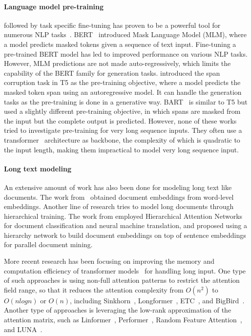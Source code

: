 \documentclass[11pt]{article}
\begin{document}
\paragraph{Language model pre-training} 
followed by task specific fine-tuning has proven to be a powerful tool for numerous NLP tasks~\cite{devlin-etal-2019-bert,liu2019roberta,zhang-etal-2019-ernie,Radford2019LanguageMA,t5,lewis-etal-2020-bart,joshi-etal-2020-spanbert}.
BERT~\cite{devlin-etal-2019-bert} introduced Mask Language Model (MLM), where a model predicts masked tokens given a sequence of text input. Fine-tuning a pre-trained BERT model has led to improved performance on various NLP tasks.
However, MLM predictions are not made auto-regressively, which limits the capability of the BERT family for generation tasks.
\citet{t5} introduced the span corruption task in T5 as the pre-training objective, where a model predicts the masked token span using an autoregressive model.
It can handle the generation tasks as the pre-training is done in a generative way.
BART~\cite{lewis-etal-2020-bart} is similar to T5 but used a slightly different pre-training objective, in which spans are masked from the input but the complete output is predicted. 
However, none of these works tried to investigate pre-training for very long sequence inputs.
They often use a transformer~\cite{transformer} architecture as backbone, the complexity of which is quadratic to the input length, making them impractical to model very long sequence input.



\paragraph{Long text modeling}
An extensive amount of work has also been done for modeling long text like documents. The work from~\citet{roy2016,chen2017,wu2018} obtained document embeddings from word-level embeddings. Another line of research tries to model long documents through hierarchical training. The work from \citet{yang-etal-2016-hierarchical,miculicich-etal-2018-document} employed Hierarchical Attention Networks for document classification and neural machine translation, and \citet{guo-etal-2019-hierarchical} proposed using a hierarchy network to build document embeddings on top of sentence embeddings for parallel document mining. 

More recent research has been focusing on improving the memory and computation efficiency of transformer models~\cite{Tay2020EfficientTA,tay2021long} for handling long input. 
One type of such approaches is using non-full attention patterns to restrict the attention field range, so that it reduces the attention complexity from $O(n^2)$ to $O(n log n)$ or $O(n)$, including Sinkhorn~\cite{Tay2020SparseSA}, Longformer~\cite{Beltagy2020Longformer}, ETC~\cite{etc}, and BigBird~\cite{bigbird}.
Another type of approaches is leveraging the low-rank approximation of the attention matrix, such as Linformer~\cite{wang2020linformer}, Performer~\cite{choromanski2021rethinking}, Random Feature Attention~\cite{peng2021random}, and LUNA~\cite{ma2021luna}.
\end{document}
